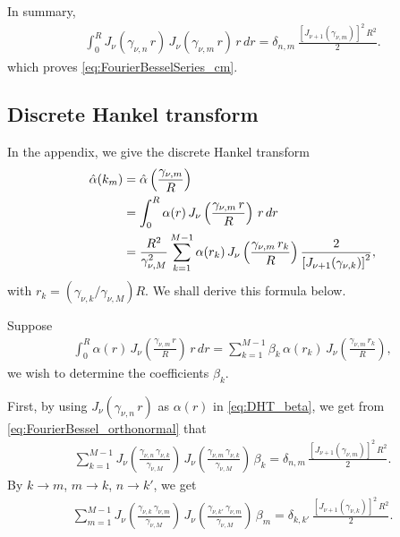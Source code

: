 \documentclass[preprint]{revtex4-1}
\numberwithin{equation}{subsection}
\numberwithin{table}{section}
\begin{document}
In summary,
\begin{align}
  \int_0^R
  J_\nu( \gamma_{\nu, n} \, r ) \,
  J_\nu( \gamma_{\nu, m} \, r ) \, r \, dr
=
  \delta_{n, m} \,
  \frac{ \left[ J_{\nu+1}( \gamma_{\nu, m} ) \right]^2 \, R^2 } { 2 }.
  \label{eq:FourierBessel_orthonormal}
\end{align}
which proves \eqref{eq:FourierBesselSeries_cm}.



\subsection{Discrete Hankel transform}



In the appendix,
we give the discrete Hankel transform
\begin{align}
\hat\alpha(k_m)
&=
\hat\alpha\left( \frac{ \gamma_{\nu, m} } { R } \right)
\notag
\\
&=
\int_0^R
\alpha(r) \,
J_\nu\left( \frac{ \gamma_{\nu, m} \, r } { R } \right) \, r \, dr
\notag
\\
&=
\frac{ R^2 } { \gamma^2_{\nu, M} }
\sum_{k = 1}^{M - 1}
\alpha(r_k) \,
J_\nu\left( \frac{ \gamma_{\nu, m} \, r_k } { R } \right)
\frac{ 2 } { \left[ J_{\nu + 1}(\gamma_{\nu, k}) \right]^2 },
\label{eq:discreteHankelTransform}
\end{align}
with
$r_k = \left(\gamma_{\nu, k} / \gamma_{\nu, M}\right) R$.
We shall derive this formula below.


Suppose
\begin{align}
\int_0^R
\alpha(r) \,
J_\nu\left( \frac{ \gamma_{\nu, m} \, r } { R } \right) \, r \, dr
=
\sum_{k = 1}^{M - 1} \beta_k \,
\alpha(r_k) \,
J_\nu\left( \frac{ \gamma_{\nu, m} \, r_k } { R } \right),
\label{eq:DHT_beta}
\end{align}
we wish to determine the coefficients $\beta_k$.


First, by using $J_\nu(\gamma_{\nu, n} \, r)$ as $\alpha(r)$
in \eqref{eq:DHT_beta},
we get from \eqref{eq:FourierBessel_orthonormal} that
\begin{align*}
\sum_{k = 1}^{M - 1}
J_\nu\left( \frac{ \gamma_{\nu, n} \, \gamma_{\nu, k} } { \gamma_{\nu, M} } \right) \,
J_\nu\left( \frac{ \gamma_{\nu, m} \, \gamma_{\nu, k} } { \gamma_{\nu, M} } \right) \,
\beta_k
=
  \delta_{n, m} \,
  \frac{ \left[ J_{\nu+1}( \gamma_{\nu, m} ) \right]^2 \, R^2 } { 2 }.
\end{align*}
By $k \rightarrow m$, $m \rightarrow k$, $n \rightarrow k'$, we get
\begin{align}
\sum_{m = 1}^{M - 1}
J_\nu\left( \frac{ \gamma_{\nu, k} \, \gamma_{\nu, m} } { \gamma_{\nu, M} } \right) \,
J_\nu\left( \frac{ \gamma_{\nu, k'} \, \gamma_{\nu, m} } { \gamma_{\nu, M} } \right) \,
\beta_m
=
  \delta_{k, k'} \,
  \frac{ \left[ J_{\nu+1}( \gamma_{\nu, k} ) \right]^2 \, R^2 } { 2 }.
  \label{eq:DHT_orthonormal}
\end{align}
\end{document}
